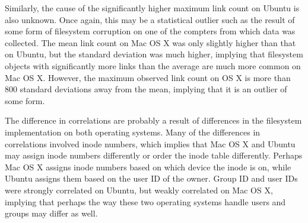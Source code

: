 \documentclass[12pt,letterpaper]{article}
\begin{document}
		Similarly, the cause of the significantly higher maximum link count on Ubuntu is also unknown. Once again, this may be a statistical outlier such as the result of some form of filesystem corruption on one of the compters from which data was collected. The mean link count on Mac OS X was only slightly higher than that on Ubuntu, but the standard deviation was much higher, implying that filesystem objects with significantly more links than the average are much more common on Mac OS X. However, the maximum observed link count on OS X is more than 800 standard deviations away from the mean, implying that it is an outlier of some form.

		The difference in correlations are probably a result of differences in the filesystem implementation on both operating systems. Many of the differences in correlations involved inode numbers, which implies that Mac OS X and Ubuntu may assign inode numbers differently or order the inode table differently. Perhaps Mac OS X assigns inode numbers based on which device the inode is on, while Ubuntu assigns them based on the user ID of the owner. Group ID and user IDs were strongly correlated on Ubuntu, but weakly correlated on Mac OS X, implying that perhaps the way these two operating systems handle users and groups may differ as well.
\end{document}
